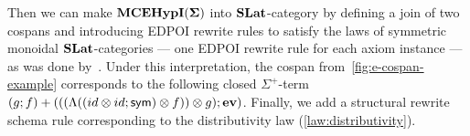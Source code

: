 Then we can make ${\mathbf{MCEHypI(\Sigma)}}$ into $\mathbf{SLat}$-category by defining a join of two cospans and introducing EDPOI rewrite rules to satisfy the laws of symmetric monoidal $\mathbf{SLat}$-categories --- one EDPOI rewrite rule for each axiom instance --- as was done by~\citet{tiurin2025equivalencehypergraphsdporewriting}.
Under this interpretation, the cospan from~\autoref{fig:e-cospan-example} corresponds to the following closed $\Sigma^{+}$-term $(g;f) + (((\Lambda((id \otimes id;\textsf{sym}) \otimes f)) \otimes g);\textbf{ev})$.
Finally, we add a structural rewrite schema rule corresponding to the distributivity law (\autoref{law:distributivity}).

